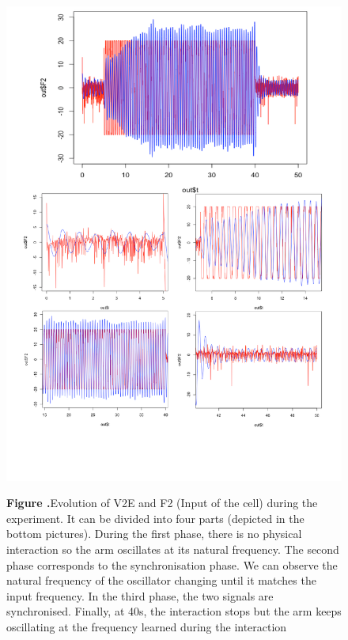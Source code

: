 \documentclass{report}
\begin{document}
\begin{figure}[h!]
\begin{center}
\includegraphics[width=15cm]{figures/oscillator_F2-v2.pdf}
\end{center}
 \textbf{\label{fig:05} Figure .}{Evolution of V2E and F2 (Input of the cell) during the experiment. It can be divided into four parts (depicted in the bottom pictures). During the first phase, there is no physical interaction so the arm oscillates at its natural frequency. The second phase corresponds to the synchronisation phase. We can observe the natural frequency of the oscillator changing until it matches the input frequency. In the third phase, the two signals are synchronised. Finally, at 40s, the interaction stops but the arm keeps oscillating at the frequency learned during the interaction}
\end{figure}
\end{document}
